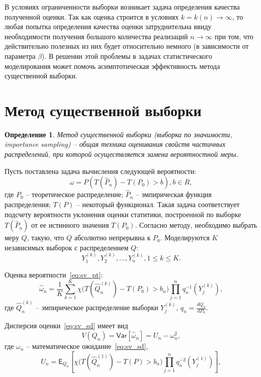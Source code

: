 \documentclass[12pt, specialist, subf, substylefile = spbu.rtx]{disser}
\newtheorem{definition}{Определение}
\newcommand{\Expect}{\mathsf{E}}
\newcommand{\Var}{\mathsf{Var}}
\begin{document}
В условиях ограниченности выборки возникает задача определения качества полученной оценки. Так как оценка строится в условиях $k=k(n) \to \infty$, то любая попытка определения качества оценки затруднительна ввиду необходимости получения большого количества реализаций $n \to \infty$ при том, что действительно полезных из них будет относительно немного (в зависимости от параметра $\beta$). В решении этой проблемы в задачах статистического моделирования может помочь асимптотическая эффективность метода существенной выборки.

\section{Метод существенной выборки}

\begin{definition}
Метод существенной выборки (выборка по значимости, importance sampling) -- общая техника оценивания свойств частичных распределений, при которой осуществляется замена вероятностной меры.
\end{definition}

Пусть поставлена задача вычисления следующей вероятности:
\begin{equation}\label{eq:sv_pt}
\omega=P(T(\hat{P}_n)-T(P_0) > b), b \in R,
\end{equation}
где $P_0$ -- теоретическое распределение; $\hat{P}_n$ -- эмпирическая функция распределения; $T(P)$ -- некоторый функционал. Такая задача соответствует подсчету вероятности уклонения оценки статитики, построенной по выборке $T(\hat{P}_n)$ от ее истинного значения $T(P_0)$. Согласно методу, необходимо выбрать меру $Q$, такую, что $Q$ абсолютно непрерывна к  $P_0$. Моделируются $K$ независимых выборок с распределением $Q$:
$$
Y_1^{(k)}, Y_2^{(k)}, ... , Y_n^{(k)}, 1 \le k \le K.
$$

Оценка вероятности~\eqref{eq:sv_pt}:
\begin{equation}\label{eq:sv_sd}
\hat{\omega}_n=\frac{1}{K} \sum\limits_{k=1}^{K}
\chi \big(T(\hat{Q}^{(k)}_n)-T(P_0) > b_n\big)
\prod\limits_{j=1}^{n} q_n^{-1}(Y_j^{(k)}),
\end{equation}
где $\hat{Q}^{(k)}_n$ -- эмпирическое распределение выборки $Y^{(k)}_j$, $q_n=\frac{dQ_n}{dP_0}$.

Дисперсия оценки~\eqref{eq:sv_sd} имеет вид
\begin{equation}\label{eq:est_disp}
V(Q_n)=\Var[\hat\omega_n]=U_n-\omega_n^2,
\end{equation}
где $\omega_n$ -- математическое ожидание~\eqref{eq:sv_sd},
$$
U_n=\Expect_{Q_n} 
\left[   
\chi \big(T(\hat{Q}^{(1)}_n)-T(P) > b_n\big)
\prod\limits_{j=1}^{n} q_n^{-2}(Y_j^{(1)})
\right],
$$
\end{document}
